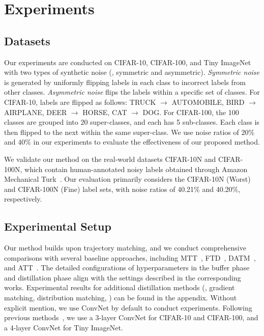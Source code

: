 \section{Experiments}



\subsection{Datasets}
Our experiments are conducted on CIFAR-10, CIFAR-100, and Tiny ImageNet with two types of synthetic noise (\ie, symmetric and asymmetric).
\textit{Symmetric noise} is generated by uniformly flipping labels in each class to incorrect labels from other classes.
\textit{Asymmetric noise} flips the labels within a specific set of classes.
For CIFAR-10, labels are flipped as follows: TRUCK $\rightarrow$ AUTOMOBILE, BIRD $\rightarrow$ AIRPLANE, DEER $\rightarrow$ HORSE, CAT $\rightarrow$ DOG. 
For CIFAR-100, the 100 classes are grouped into 20 super-classes, and each has 5 sub-classes. 
Each class is then flipped to the next within the same super-class.
We use noise ratios of $20\%$ and $40\%$ in our experiments to evaluate the effectiveness of our proposed method.


We validate our method on the real-world datasets CIFAR-10N and CIFAR-100N, which contain human-annotated noisy labels obtained through Amazon Mechanical Turk~\cite{wei2022learning}.
Our evaluation primarily considers the CIFAR-10N (Worst) and CIFAR-100N (Fine) label sets, with noise ratios of 40.21$\%$ and 40.20$\%$, respectively.


\subsection{Experimental Setup}

Our method builds upon trajectory matching, and we conduct comprehensive comparisons with several baseline approaches, including MTT~\cite{cazenavette2022distillation}, FTD~\cite{du2023minimizing}, DATM~\cite{guo2024lossless}, and ATT~\cite{liu2024dataset}.
The detailed configurations of hyperparameters in the buffer phase and distillation phase align with the settings described in the corresponding works.
Experimental results for additional distillation methods (\eg, gradient matching, distribution matching, \etc) can be found in the appendix.
Without explicit mention, we use ConvNet by default to conduct experiments.
Following previous methods~\cite{cazenavette2022distillation, du2023minimizing, guo2024lossless, liu2024dataset}, we use a 3-layer ConvNet for CIFAR-10 and CIFAR-100, and a 4-layer ConvNet for Tiny ImageNet.



